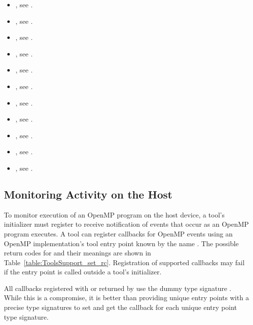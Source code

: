 \crossreferences
\begin{itemize}
\item {}, see .
\item {}, see
  .
\item {}, see .
\item {}, see .
\item {}, see .
\item {}, see .
\item {}, see .
\item {}, see .
\item {}, see .
\item {}, see .
\item {}, see .
\end{itemize}

\subsection{Monitoring Activity on the Host}
\label{sec:ompt-register-callbacks}

To monitor execution of an OpenMP program on the host device, a tool's
initializer must register to receive notification
of events that occur as an OpenMP program executes.  
A tool can register callbacks for OpenMP events using
an OpenMP implementation's tool entry point known by the name
.  The possible return codes for
 and their meanings are shown in
Table~\ref{table:ToolsSupport_set_rc}.  Registration of supported
callbacks may fail if the  entry point is
called outside a tool's initializer.

All callbacks registered with  or returned
by  use the dummy type signature
.  While this is a compromise, it is better
than providing unique entry points with a precise type signatures to
set and get the callback for each unique entry point type signature.

